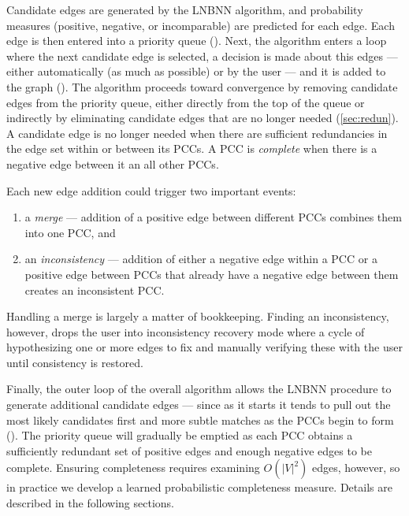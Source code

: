 Candidate edges are generated by the LNBNN algorithm, and probability measures
  (positive, negative, or incomparable) are predicted for each edge.
Each edge is then entered into a priority queue ().
Next, the algorithm enters a loop where the next candidate edge is selected, a
  decision is made about this edges --- either automatically (as much as
  possible) or by the user --- and it is added to the graph
  ().
The algorithm proceeds toward convergence by removing candidate edges from the
  priority queue, either directly from the top of the queue or indirectly by
  eliminating candidate edges that are no longer needed (\cref{sec:redun}).
A candidate edge is no longer needed when there are sufficient redundancies in
  the edge set within or between its PCCs.
A PCC is \emph{complete} when there is a negative edge between it an all other
  PCCs.

Each new edge addition could trigger two important events:
\begin{enumerate}[label={(\arabic*)}]

    \item a \emph{merge} --- addition of a positive edge between different
      PCCs combines them into one PCC, and

    \item an \emph{inconsistency} --- addition of either a negative edge
      within a PCC or a positive edge between PCCs that already have a negative
      edge between them creates an inconsistent PCC.

\end{enumerate}
Handling a merge is largely a matter of bookkeeping.
Finding an inconsistency, however, drops the user into inconsistency recovery
  mode where a cycle of hypothesizing one or more edges to fix and manually
  verifying these with the user until consistency is restored.

Finally, the outer loop of the overall algorithm allows the LNBNN procedure to
  generate additional candidate edges --- since as it starts it tends to pull
  out the most likely candidates first and more subtle matches as the PCCs begin
  to form ().
The priority queue will gradually be emptied as each PCC obtains a
  sufficiently redundant set of positive edges and enough negative edges to be
  complete.
Ensuring completeness requires examining $O(|V|^2)$ edges, however, so in
  practice we develop a learned probabilistic completeness measure.
Details are described in the following sections.

